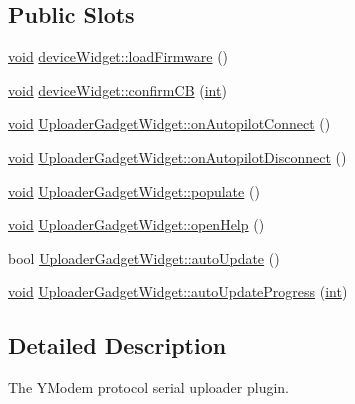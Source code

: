 \subsection*{Public Slots}
\begin{DoxyCompactItemize}
\item 
\hyperlink{group___u_a_v_objects_plugin_ga444cf2ff3f0ecbe028adce838d373f5c}{void} \hyperlink{group___y_modem_uploader_gafbf692fdd482b85feb6510193a242a87}{device\-Widget\-::load\-Firmware} ()
\item 
\hyperlink{group___u_a_v_objects_plugin_ga444cf2ff3f0ecbe028adce838d373f5c}{void} \hyperlink{group___y_modem_uploader_ga116ecb3aed92f7f793ea4769a7e0572d}{device\-Widget\-::confirm\-C\-B} (\hyperlink{ioapi_8h_a787fa3cf048117ba7123753c1e74fcd6}{int})
\item 
\hyperlink{group___u_a_v_objects_plugin_ga444cf2ff3f0ecbe028adce838d373f5c}{void} \hyperlink{group___y_modem_uploader_gaea63c2ee4a2337a9c75b7e6908a07f68}{Uploader\-Gadget\-Widget\-::on\-Autopilot\-Connect} ()
\item 
\hyperlink{group___u_a_v_objects_plugin_ga444cf2ff3f0ecbe028adce838d373f5c}{void} \hyperlink{group___y_modem_uploader_ga1b05eaf13f62105422817f202a60d4c5}{Uploader\-Gadget\-Widget\-::on\-Autopilot\-Disconnect} ()
\item 
\hyperlink{group___u_a_v_objects_plugin_ga444cf2ff3f0ecbe028adce838d373f5c}{void} \hyperlink{group___y_modem_uploader_ga5c67435d0108ea6ee60ef37fd1ad3298}{Uploader\-Gadget\-Widget\-::populate} ()
\item 
\hyperlink{group___u_a_v_objects_plugin_ga444cf2ff3f0ecbe028adce838d373f5c}{void} \hyperlink{group___y_modem_uploader_ga49b9f0a5fc35f08fc0ee463dedcfe341}{Uploader\-Gadget\-Widget\-::open\-Help} ()
\item 
bool \hyperlink{group___y_modem_uploader_gae4f6b196112377e3983e45e785c14242}{Uploader\-Gadget\-Widget\-::auto\-Update} ()
\item 
\hyperlink{group___u_a_v_objects_plugin_ga444cf2ff3f0ecbe028adce838d373f5c}{void} \hyperlink{group___y_modem_uploader_gaa59bd4196108e1a79e22ee1d10cf4a92}{Uploader\-Gadget\-Widget\-::auto\-Update\-Progress} (\hyperlink{ioapi_8h_a787fa3cf048117ba7123753c1e74fcd6}{int})
\end{DoxyCompactItemize}


\subsection{Detailed Description}
The Y\-Modem protocol serial uploader plugin. 

